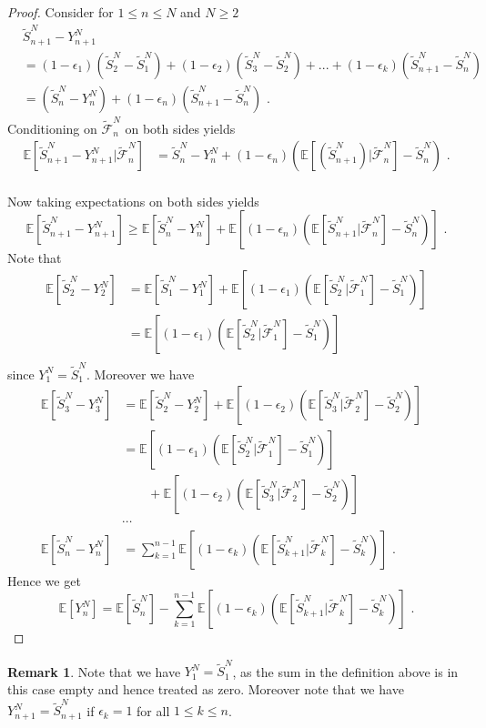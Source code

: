 \documentclass[phd]{UWMThesis}
\newcommand{\E}{\mathbb{E}}
\newcommand{\F}{\mathcal{F}}
\newcommand{\StN}[1]{\tilde{S}_{#1}^N}
\newcommand{\FtN}[1]{\tilde{\F}_{#1}^N}
\newcommand{\YN}[1]{Y_{#1}^N}
\newcommand{\mdot}{\textrm{ .}}
\renewcommand{\.}{\textrm{ .}}
\theoremstyle{definition}
\newtheorem{remark}[thm]{Remark}
\numberwithin{thm}{chapter}
\begin{document}
\begin{proof}
	Consider for $1\leq n\leq N$ and $N\geq 2$
	\begin{align*}
	&  \StN{n+1} - \YN{n+1} \\ 
	&= (1-\epsilon_1)(\StN{2} - \StN{1}) + (1-\epsilon_2)(\StN{3} - \StN{2}) + ... + (1-\epsilon_k)(\StN{n+1} - \StN{n})\\ 
	&= (\StN{n} - \YN{n}) + (1-\epsilon_n)(\StN{n+1} - \StN{n}) \mdot
	\end{align*}
	Conditioning on $\FtN{n}$ on both sides yields
	\begin{align*}
	\E[\StN{n+1} - \YN{n+1}|\FtN{n}] &= \StN{n} - \YN{n} + (1-\epsilon_n)\left(\E[(\StN{n+1})|\FtN{n}]  - \StN{n} \right)\mdot
	\end{align*}
	\\
	Now taking expectations on both sides yields
	$$\E[\StN{n+1} - \YN{n+1}] \geq \E[\StN{n} - \YN{n}] + \E\left[(1-\epsilon_n)\left(\E[\StN{n+1}|\FtN{n}]  - \StN{n} \right)\right]\mdot$$
	Note that 
	\begin{align*}
	\E[\StN{2} - \YN{2}] &= \E[\StN{1} - \YN{1}] + \E\left[(1-\epsilon_1)\left(\E[\StN{2}|\FtN{1}]  - \StN{1} \right)\right]\\ 
	&= \E\left[(1-\epsilon_1)\left(\E[\StN{2}|\FtN{1}]  - \StN{1} \right)\right]\\ 
	\end{align*}
	since $\YN{1} = \StN{1}$. Moreover we have
	\begin{align*}
	\E[\StN{3} - \YN{3}] &= \E[\StN{2} - \YN{2}] + \E\left[(1-\epsilon_2)\left(\E[\StN{3}|\FtN{2}]  - \StN{2} \right)\right]\\  
	&= \E\left[(1-\epsilon_1)\left(\E[\StN{2}|\FtN{1}]  - \StN{1} \right)\right]\\
	&\qquad + \E\left[(1-\epsilon_2)\left(\E[\StN{3}|\FtN{2}]  - \StN{2} \right)\right]\\  
	&\cdots& \\ 
	\E[\StN{n} - \YN{n}] &= \sum_{k=1}^{n-1}\E\left[(1-\epsilon_k)\left(\E[\StN{k+1}|\FtN{k}]  - \StN{k} \right)\right]\mdot
	\end{align*}
	Hence we get
	\begin{equation*}
	\E[\YN{n}] = \E[\StN{n}] - \sum_{k=1}^{n-1}\E\left[(1-\epsilon_k)\left(\E[\StN{k+1}|\FtN{k}]  - \StN{k} \right)\right]\mdot
	\end{equation*}	
\end{proof}
%
\begin{remark}
	Note that we have $\YN{1}=\StN{1}$, as the sum in the definition above is in this case empty and hence treated as zero. Moreover note that we have $\YN{n+1} = \StN{n+1}$ if $\epsilon_k=1$ for all $1\leq k \leq n$. 
\end{remark}
\end{document}
